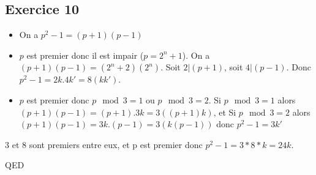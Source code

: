 \documentclass[]{book}
\theoremstyle{definition}
\begin{document}
\subsection*{Exercice 10}
\begin{itemize}
\item On a $p^2-1 = (p+1)(p-1)$
\item $p$ est premier donc il est impair ($p=2^n+1$). On a $(p+1)(p-1) = (2^n+2)(2^n)$. Soit $2|(p+1)$, soit $4|(p-1)$. Donc $p^2-1=2k.4k' = 8(kk')$.
\item $p$ est premier donc $p \mod 3 =1$ ou $p \mod 3 =2$. Si $p \mod 3 =1$  alors $(p+1)(p-1) = (p+1).3k = 3((p+1)k)$, et Si $p \mod 3 =2$  alors $(p+1)(p-1) = 3k.(p-1) = 3(k(p-1))$ donc $p^2-1 = 3k'$
\end{itemize}

3 et 8 sont premiers entre eux, et p est premier donc $p^2-1=3*8*k = 24k$.

QED
\end{document}
